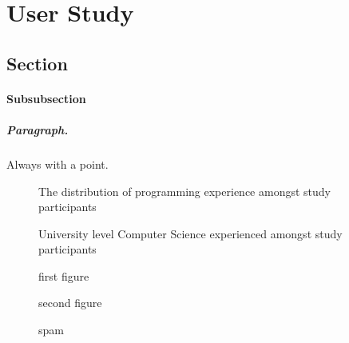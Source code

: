 \chapter{User Study}
\label{chap:userstudy}
\section{Section}
%
\subsubsection{Subsubsection}

\paragraph{Paragraph.} Always with a point.

\begin{figure}[H]
	\scalebox{0.75}{}
	\caption{The distribution of programming experience amongst study participants}
	\label{fig:programmingexp}
\end{figure}

\begin{figure}[H]
	\scalebox{1}{}
	\caption{University level Computer Science experienced amongst study participants}
	\label{fig:uniexp}
\end{figure}

\begin{figure}[H]
	\centering
	\begin{minipage}{0.45\textwidth}
		\centering
		\scalebox{0.7}{}
		\caption{first figure}
    \end{minipage}\hspace{-1em}
	\begin{minipage}{0.45\textwidth}
		\centering
		\scalebox{0.7}{}
		\caption{second figure}
	\end{minipage}
\end{figure}



\begin{figure}[H]
	\scalebox{0.72}{}
	\caption{spam}
	\label{fig:uniexp}
\end{figure}

